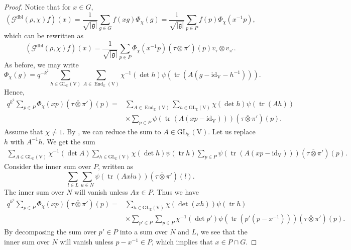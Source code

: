 \documentclass[12pt, reqno]{amsart}
\theoremstyle{definition}
\theoremstyle{definition}
\theoremstyle{definition}
\newcommand{\EndomorphismRing}{\operatorname{End}}
\newcommand{\idmap}{\mathrm{id}}
\newcommand{\sizeof}[1]{\left|#1\right|}
\newcommand{\hermitianSpace}{\mathrm{V}}
\newcommand{\fieldCharacter}{\psi}
\newcommand{\trace}{\operatorname{tr}}
\newcommand{\GL}{\mathrm{GL}}
\newcommand{\quadraticExtension}{\mathbb{E}}
\newcommand{\dblGaussSum}[2]{\mathcal{G}^{\mathrm{dbl}}\left(#1, #2\right)}
\newcommand{\lieAlgebra}{\mathfrak{g}}
\begin{document}
\begin{proof}
	Notice that for $x \in G$, $$\left(\dblGaussSum{\rho}{\chi} f\right)\left(x\right) = \frac{1}{\sqrt{\sizeof{\lieAlgebra}}} \sum_{g \in G} f\left(xg\right) \Phi_{\chi}\left(g\right) = \frac{1}{\sqrt{\sizeof{\lieAlgebra}}} \sum_{p \in P} f\left(p\right) \Phi_{\chi}\left(x^{-1} p\right),$$
	which can be rewritten as
	$$\left(\dblGaussSum{\rho}{\chi} f\right)\left(x\right) = \frac{1}{\sqrt{\sizeof{\lieAlgebra}}} \sum_{p \in P}  \Phi_{\chi}\left(x^{-1} p\right) \left(\tau \overline{\otimes} \pi'\right)\left(p\right) v_\tau \otimes v_{\pi'}.$$
	As before, we may write
	$$\Phi_{\chi}\left(g\right) = q^{-k^2} \sum_{h \in \GL_{\quadraticExtension}\left(\hermitianSpace\right)} \sum_{A \in \EndomorphismRing_{\quadraticExtension}\left(\hermitianSpace\right)} \chi^{-1}\left(\det h\right) \fieldCharacter\left(\trace\left(A \left(g - \idmap_{\hermitianSpace} - h^{-1}\right)\right)\right).$$
	Hence, \begin{align*}
		q^{k^2} \sum_{p \in P} \Phi_{\chi}\left(xp\right) \left(\tau \overline{\otimes} \pi'\right)\left(p\right) =& \sum_{A \in \EndomorphismRing_{\quadraticExtension}\left(\hermitianSpace\right)} \sum_{h \in \GL_{\quadraticExtension}\left(\hermitianSpace\right)} \chi\left(\det h\right)\fieldCharacter\left(\trace\left(Ah\right)\right) \\
		& \times \sum_{p \in P} \fieldCharacter\left(\trace\left(A \left(xp - \idmap_{\hermitianSpace}\right)\right)\right) \left(\tau \overline{\otimes} \pi'\right)\left(p\right).
	\end{align*}
	Assume that $\chi \ne 1$. By , we can reduce the sum to $A \in \GL_{\quadraticExtension}\left(\hermitianSpace\right)$. Let us replace $h$ with $A^{-1} h$. We get the sum
	\begin{align*}
		\sum_{A \in \GL_{\quadraticExtension}\left(\hermitianSpace\right)} \chi^{-1}\left(\det A\right) \sum_{h \in \GL_{\quadraticExtension}\left(\hermitianSpace\right)} \chi\left(\det h\right)\fieldCharacter\left(\trace h\right) \sum_{p \in P} \fieldCharacter\left(\trace\left(A \left(xp - \idmap_{\hermitianSpace}\right)\right)\right) \left(\tau \overline{\otimes} \pi'\right)\left(p\right).
	\end{align*}
	Consider the inner sum over $P$, written as $$\sum_{l \in L} \sum_{u \in N} \fieldCharacter\left(\trace\left(A x l u\right)\right) \left(\tau \overline{\otimes} \pi'\right)\left(l\right).$$
	The inner sum over $N$ will vanish unless $Ax \in P$. Thus we have
	\begin{align*}
		q^{k^2} \sum_{p \in P} \Phi_{\chi}\left(xp\right) \left(\tau \overline{\otimes} \pi'\right)\left(p\right) =& \sum_{h \in \GL_{\quadraticExtension}\left(\hermitianSpace\right)}  \chi\left(\det\left(xh\right)\right) \fieldCharacter\left(\trace h\right) \\
		& \times \sum_{p' \in P} \sum_{p \in P} \chi^{-1}\left(\det p'\right) \fieldCharacter\left(\trace\left(p' \left(p - x^{-1}\right)\right)\right) \left(\tau \overline{\otimes} \pi'\right)\left(p\right).
	\end{align*}
	By decomposing the sum over $p' \in P$ into a sum over $N$ and $L$, we see that the inner sum over $N$ will vanish unless $p - x^{-1} \in P$, which implies that $x \in P \cap G$.
	

\end{proof}
\end{document}
